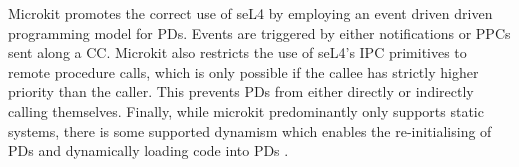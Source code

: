 Microkit promotes the correct use of seL4 by employing an event driven driven programming model for PDs. Events are triggered by
either notifications or PPCs sent along a CC. Microkit also restricts the use of seL4's IPC primitives to remote procedure calls,
which is only possible if the callee has strictly higher priority than the caller. This prevents PDs from either directly or 
indirectly calling themselves. Finally, while microkit predominantly only supports static systems, there is 
some supported dynamism which enables the re-initialising of PDs and dynamically loading code into PDs \cite{Heiser_PCVL_22}.
